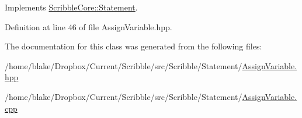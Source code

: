 Implements \hyperlink{class_scribble_core_1_1_statement_a532ed5a44ec49873dc191dae7ddc8b00}{Scribble\-Core\-::\-Statement}.



Definition at line 46 of file Assign\-Variable.\-hpp.



The documentation for this class was generated from the following files\-:\begin{DoxyCompactItemize}
\item 
/home/blake/\-Dropbox/\-Current/\-Scribble/src/\-Scribble/\-Statement/\hyperlink{_assign_variable_8hpp}{Assign\-Variable.\-hpp}\item 
/home/blake/\-Dropbox/\-Current/\-Scribble/src/\-Scribble/\-Statement/\hyperlink{_assign_variable_8cpp}{Assign\-Variable.\-cpp}\end{DoxyCompactItemize}
